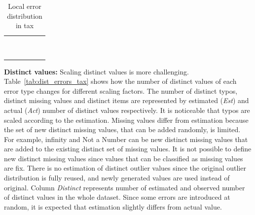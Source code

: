 \begin{table}[!t]
\caption{\label{tab:local_errors_tax} Local error distribution in tax}
\centering
\begin{tabular}{r|K|K|K|K|K}
\toprule
{} &  &  &  &  &   \\ \midrule
   &    &    &     &     &     \\
   &    &    &    &     &     \\
   &    &    &    &     &    \\
   &   &   &    &     &    \\
  &   &   &    &    &    \\
  &   &   &   &    &   \\
  &  &   &   &    &   \\
 &  &  &   &   &   \\
 &  &  &  &   &  \\
\bottomrule
\end{tabular}
\end{table}

\textbf{Distinct values:} 
Scaling distinct values is more challenging. 
Table~\ref{tab:dist_errors_tax} shows how the number of distinct values of each error type changes for different scaling factors.
The number of distinct typos, distinct missing values and distinct items are represented by estimated (\textit{Est}) and actual (\textit{Act}) number of distinct values respectively.
It is noticeable that typos are scaled according to the estimation.
Missing values differ from estimation because the set of new distinct missing values, that can be added randomly, is limited.
For example, infinity and Not a Number can be new distinct missing values that are added to the existing distinct set of missing values.
It is not possible to define new distinct missing values since values that can be classified as missing values are fix.
There is no estimation of distinct outlier values since the original outlier distribution is fully reused, and newly generated values are used instead of original. 
Column \textit{Distinct} represents number of estimated and observed number of distinct values in the whole dataset.
Since some errors are introduced at random, it is expected that estimation slightly differs from actual value. 

